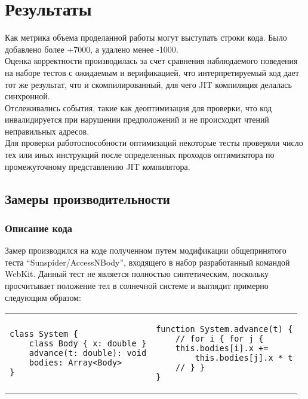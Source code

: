 \documentclass[times,specification,annotation]{itmo-student-thesis}
\begin{document}
\chapter{Результаты}
Как метрика объема проделанной работы могут выступать строки кода. Было добавлено более {\color{green}+7000}, а удалено менее {\color{red}-1000}.\\

Оценка корректности производилась за счет сравнения наблюдаемого поведения на наборе тестов с ожидаемым и верификацией, что интерпретируемый код дает тот же результат, что и скомпилированный, для чего JIT компиляция делалась синхронной.\\
Отслеживались события, такие как деоптимизация для проверки, что код инвалидируется при нарушении предположений и не происходит чтений неправильных адресов.\\
Для проверки работоспособности оптимизаций некоторые тесты проверяли число тех или иных инструкций после определенных проходов оптимизатора по промежуточному представлению JIT компилятора.

\section{Замеры производительности}
\subsection{Описание кода}
Замер производился на коде полученном путем модификации общепринятого теста ``Sunspider/AccessNBody'', входящего в набор разработанный командой WebKit. Данный тест не является полностью синтетическим, поскольку просчитывает положение тел в солнечной системе и выглядит примерно следующим образом:\\
\begin{center}
\begin{tabular}[t]{p{}|p{}}
\begin{lstlisting}
class System {
	class Body { x: double }
	advance(t: double): void
	bodies: Array<Body>
}
\end{lstlisting} &
\begin{lstlisting}
function System.advance(t) {
	// for i { for j {
	this.bodies[i].x +=
		this.bodies[j].x * t
	// } }
}
\end{lstlisting}
\end{tabular}
\end{center}
\end{document}
